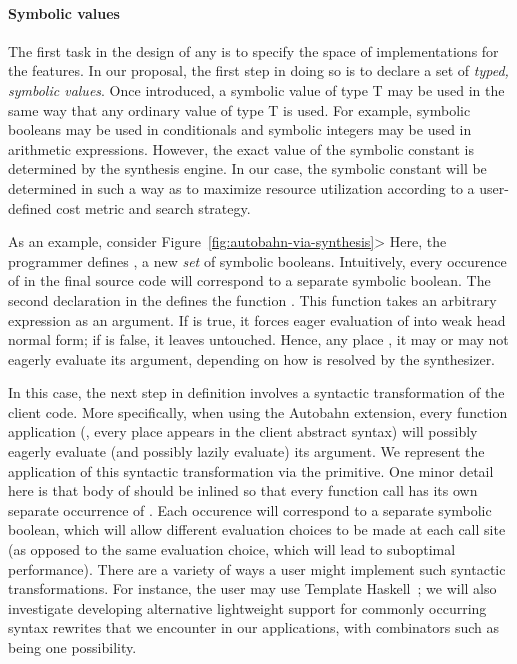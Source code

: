 \paragraph*{Symbolic values}
The first task in the design of any \rasp{} is to specify the space of
implementations for the \rasp{} features.  In our proposal, the first step
in doing so is to declare a set of \emph{typed, symbolic values}.  Once introduced, a symbolic value 
of type T may be used in the same way that any ordinary value of type T is used.
For example, symbolic booleans may be used in conditionals and symbolic integers may be used
in arithmetic expressions.  However, the exact value of the symbolic constant is
determined by the synthesis engine.  In our case, the symbolic constant will be determined 
in such a way as to maximize resource utilization according to a user-defined cost metric and 
search strategy.

As an example, consider Figure~\ref{fig:autobahn-via-synthesis}>  Here, the programmer 
defines , a new \emph{set} of symbolic booleans.  Intuitively, every occurence of 
in the final source code will correspond to a separate symbolic boolean.  The second declaration in
the \rasp{} defines the function .  This function takes an arbitrary expression 
as an argument.  If  is true, it forces eager evaluation of  into weak head normal
form; if   is false, it leaves  untouched.  Hence, any place , it
may or may not eagerly evaluate its argument, depending on how  is resolved by the 
synthesizer.

In this case, the next step in \rasp{} definition involves a syntactic transformation of the client
code.  More specifically, when using the Autobahn extension, every function 
application (\ie, every place  appears in the client abstract syntax) will
possibly eagerly evaluate (and possibly lazily evaluate) its argument.  We represent the application
of this syntactic transformation via the  primitive.  One minor detail here is
that body of  should be inlined so that every function call has its own separate occurrence
of .  Each occurence will correspond to a separate symbolic boolean, which will allow
different evaluation choices to be made at each call site (as opposed to the same evaluation choice,
which will lead to suboptimal performance).  There are a variety of ways
a user might implement such syntactic transformations.  For instance, the user may use Template 
Haskell~\cite{template-haskell}; we will also investigate developing alternative lightweight support for 
commonly occurring syntax rewrites that we encounter in our applications, with combinators such as
 being one possibility. 

